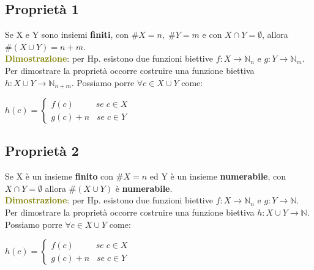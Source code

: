 \subsection{Proprietà 1}
Se X e Y sono insiemi \textbf{finiti}, con $\#X = n, \; \#Y = m$ e con $X \cap Y = \emptyset$, allora $\#(X \cup Y) = n + m$. \\
\textcolor{olive}{\textbf{Dimostrazione}}: per Hp. esistono due funzioni biettive $f : X \rightarrow \mathbb{N}_n$ e $g : Y \rightarrow \mathbb{N}_m$. Per dimostrare la proprietà occorre costruire una funzione biettiva $h : X \cup Y \rightarrow \mathbb{N}_{n + m}$. Possiamo porre $\forall c \in X \cup Y$ come:
\begin{center}
    \begin{math}
        h(c) = 
        \begin{cases}
            f(c) \qquad \;\; se \; c \in X \\
            g(c) + n \; \;\; se \; c \in Y
        \end{cases}
    \end{math}
\end{center}

\subsection{Proprietà 2}
Se X è un insieme \textbf{finito} con $\#X = n$ ed Y è un insieme \textbf{numerabile}, con $X \cap Y = \emptyset$ allora $\#(X \cup Y)$ è \textbf{numerabile}. \\
\textcolor{olive}{\textbf{Dimostrazione}}: per Hp. esistono due funzioni biettive $f : X \rightarrow \mathbb{N}_n$ e $g : Y \rightarrow \mathbb{N}$. Per dimostrare la proprietà occorre costruire una funzione biettiva $h : X \cup Y \rightarrow \mathbb{N}$. Possiamo porre $\forall c \in X \cup Y$ come:
\begin{center}
    \begin{math}
        h(c) = 
        \begin{cases}
            f(c) \qquad \;\; se \; c \in X \\
            g(c) + n \; \;\; se \; c \in Y
        \end{cases}
    \end{math}
\end{center}
